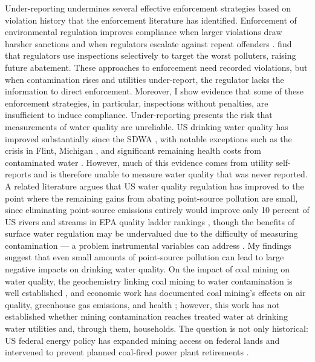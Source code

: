 \documentclass[12pt]{article}
\begin{document}
Under-reporting undermines several effective enforcement strategies based on violation history that the enforcement literature has identified. Enforcement of environmental regulation improves compliance when larger violations draw harsher sanctions \parencite{shimshack2014economics, harford1987self} and when regulators escalate against repeat offenders \parencite{blundell2020escalation, blundell2020threats}. \textcite{duflo2018value} find that regulators use inspections selectively to target the worst polluters, raising future abatement. These approaches to enforcement need recorded violations, but when contamination rises and utilities under-report, the regulator lacks the information to direct enforcement. Moreover, I show evidence that some of these enforcement strategies, in particular, inspections without penalties, are insufficient to induce compliance. Under-reporting presents the risk that measurements of water quality are unreliable. US drinking water quality has improved substantially since the SDWA \parencite{keiser2026water}, with notable exceptions such as the crisis in Flint, Michigan \parencite{christensen2023flint}, and significant remaining health costs from contaminated water \parencite{hill2017shale, keiser2019us, disalvo2024drinking, marcus2025testing}. However, much of this evidence comes from utility self-reports and is therefore unable to measure water quality that was never reported. A related literature argues that US water quality regulation has improved to the point where the remaining gains from abating point-source pollution are small, since eliminating point-source emissions entirely would improve only 10 percent of US rivers and streams in EPA quality ladder rankings \parencite{bingham2000}, though the benefits of surface water regulation may be undervalued due to the difficulty of measuring contamination --- a problem instrumental variables can address \parencite{keiser2019missing}. My findings suggest that even small amounts of point-source pollution can lead to large negative impacts on drinking water quality. On the impact of coal mining on water quality, the geochemistry linking coal mining to water contamination is well established \parencite{skousen2019acid, akcil2006acid}, and economic work has documented coal mining's effects on air quality, greenhouse gas emissions, and health \parencite{muller2011environmental, parfitt2024there}; however, this work has not established whether mining contamination reaches treated water at drinking water utilities and, through them, households. The question is not only historical: US federal energy policy has expanded mining access on federal lands and intervened to prevent planned coal-fired power plant retirements \parencite{Trump2025EO14260, Trump2025EO14261, Trump2025Proc10914, Daly2025CoalMining}.
\end{document}
